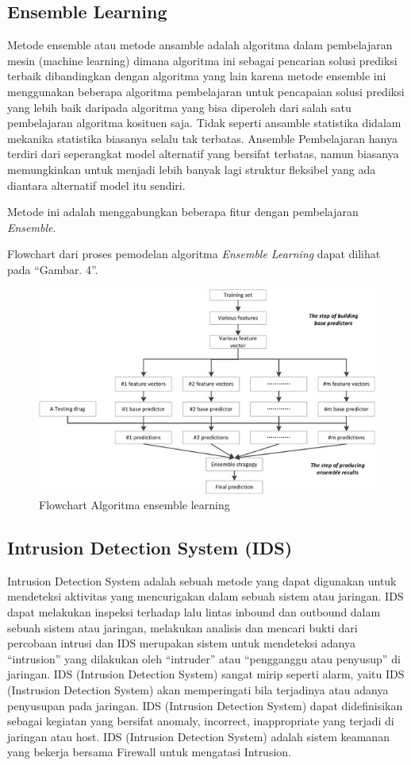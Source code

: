 \documentclass[conference]{IEEEtran}
\begin{document}
\subsection{Ensemble Learning}

Metode ensemble atau metode ansamble adalah algoritma dalam pembelajaran mesin (machine learning) dimana algoritma ini sebagai pencarian solusi prediksi terbaik dibandingkan dengan algoritma yang lain karena metode ensemble ini menggunakan beberapa algoritma pembelajaran untuk pencapaian solusi prediksi yang lebih baik daripada algoritma yang bisa diperoleh dari salah satu pembelajaran algoritma kosituen saja. Tidak seperti ansamble statistika didalam mekanika statistika biasanya selalu tak terbatas. Ansemble Pembelajaran hanya terdiri dari seperangkat model alternatif yang bersifat terbatas, namun biasanya memungkinkan untuk menjadi lebih banyak lagi struktur fleksibel yang ada diantara alternatif model itu sendiri.

Metode ini adalah menggabungkan beberapa fitur dengan pembelajaran \emph{Ensemble}.

Flowchart dari proses pemodelan algoritma \emph{Ensemble Learning} dapat dilihat pada ``Gambar. 4''\cite{zhang}.\vspace{6pt}

\begin{figure}
\centering
\includegraphics[width=.4\textwidth]{Gambar/gambar4.png}
\caption{Flowchart Algoritma ensemble learning}
\end{figure}

\subsection{ Intrusion Detection System (IDS)}\label{IDS}

Intrusion Detection System adalah sebuah metode yang dapat digunakan untuk mendeteksi aktivitas yang mencurigakan dalam sebuah sistem atau jaringan. IDS dapat melakukan inspeksi terhadap lalu lintas inbound dan outbound dalam sebuah sistem atau jaringan, melakukan analisis dan mencari bukti dari percobaan intrusi dan IDS merupakan sistem untuk mendeteksi adanya “intrusion”
yang dilakukan oleh “intruder” atau “pengganggu atau
penyusup” di jaringan. IDS (Intrusion Detection System)
sangat mirip seperti alarm, yaitu IDS (Instrusion Detection System) akan memperingati bila terjadinya atau adanya
penyusupan pada jaringan. IDS (Intrusion Detection System)
dapat didefinisikan sebagai kegiatan yang bersifat anomaly,
incorrect, inappropriate yang terjadi di jaringan atau host. IDS
(Intrusion Detection System) adalah sistem keamanan yang
bekerja bersama Firewall untuk mengatasi Intrusion.
\end{document}
